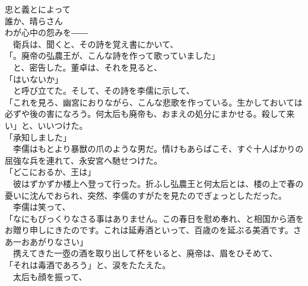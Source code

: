 \documentclass[
  paper=a5,
  fontsize=10pt,
  jafontsize=9.5pt,
  tate,                  %
  open_bracket_pos=nibu, %
]{jlreq}
\begin{document}
忠と義とによって\\


誰か、晴らさん\\


わが心中の怨みを――\\



　衛兵は、聞くと、その詩を覚え書にかいて、\\


「。廃帝の弘農王が、こんな詩を作って歌っていました」\\


　と、密告した。董卓は、それを見ると、\\


「はいないか」\\


　と呼び立てた。そして、その詩を李儒に示して、\\


「これを見ろ、幽宮におりながら、こんな悲歌を作っている。生かしておいては必ずや後の害になろう。何太后も廃帝も、おまえの処分にまかせる。殺して来い」と、いいつけた。\\


「承知しました」\\


　李儒はもとより暴獣の爪のような男だ。情けもあらばこそ、すぐ十人ばかりの屈強な兵を連れて、永安宮へ馳せつけた。\\


「どこにおるか、王は」\\


　彼はずかずか楼上へ登って行った。折ふし弘農王と何太后とは、楼の上で春の憂いに沈んでおられ、突然、李儒のすがたを見たのでぎょっとしただった。\\


　李儒は笑って、\\


「なにもびっくりなさる事はありません。この春日を慰め奉れ、と相国から酒をお贈り申しにきたのです。これは延寿酒といって、百歳のを延ぶる美酒です。さあ一おあがりなさい」\\


　携えてきた一壺の酒を取り出して杯をいると、廃帝は、眉をひそめて、\\


「それは毒酒であろう」と、涙をたたえた。\\


　太后も顔を振って、\\
\end{document}
